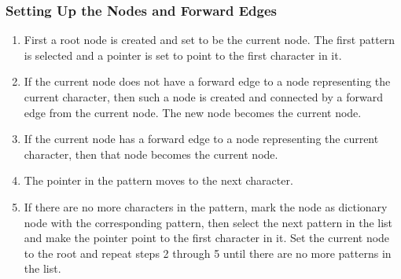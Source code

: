 \documentclass[paper=a4, fontsize=11pt]{scrartcl} %
\numberwithin{equation}{section} %
\numberwithin{figure}{section} %
\numberwithin{table}{section} %
\begin{document}
\subsubsection{Setting Up the Nodes and Forward Edges}
\begin{enumerate}
\item First a root node is created and set to be the current node. The first pattern is selected and a pointer is set to point to the first character in it.

\item If the current node does not have a forward edge to a node representing the current character, then such a node is created and connected by a forward edge from the current node. The new node becomes the current node.

\item If the current node has a forward edge to a node representing the current character, then that node becomes the current node.

\item The pointer in the pattern moves to the next character.

\item If there are no more characters in the pattern, mark the node as dictionary node with the corresponding pattern, then select the next pattern in the list and make the pointer point to the first character in it. Set the current node to the root and repeat steps 2 through 5 until there are no more patterns in the list.
\end{enumerate}
\end{document}
